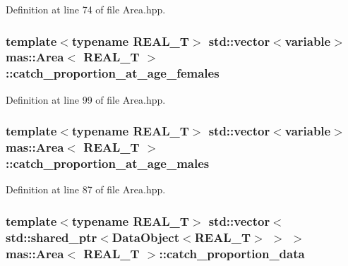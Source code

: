 Definition at line 74 of file Area.\-hpp.

\hypertarget{structmas_1_1_area_a1e2aa0671666187c26108ef2dc669239}{
\subsubsection[{catch\-\_\-proportion\-\_\-at\-\_\-age\-\_\-females}]{\setlength{\rightskip}{0pt plus 5cm}template$<$typename R\-E\-A\-L\-\_\-\-T$>$ std\-::vector$<${\bf variable}$>$ {\bf mas\-::\-Area}$<$ R\-E\-A\-L\-\_\-\-T $>$\-::catch\-\_\-proportion\-\_\-at\-\_\-age\-\_\-females}}\label{structmas_1_1_area_a1e2aa0671666187c26108ef2dc669239}


Definition at line 99 of file Area.\-hpp.

\hypertarget{structmas_1_1_area_a4c7e17b198774676569c7ab30987fee6}{
\subsubsection[{catch\-\_\-proportion\-\_\-at\-\_\-age\-\_\-males}]{\setlength{\rightskip}{0pt plus 5cm}template$<$typename R\-E\-A\-L\-\_\-\-T$>$ std\-::vector$<${\bf variable}$>$ {\bf mas\-::\-Area}$<$ R\-E\-A\-L\-\_\-\-T $>$\-::catch\-\_\-proportion\-\_\-at\-\_\-age\-\_\-males}}\label{structmas_1_1_area_a4c7e17b198774676569c7ab30987fee6}


Definition at line 87 of file Area.\-hpp.

\hypertarget{structmas_1_1_area_a3a14e9f155e3184451799e8fc8db97ab}{
\subsubsection[{catch\-\_\-proportion\-\_\-data}]{\setlength{\rightskip}{0pt plus 5cm}template$<$typename R\-E\-A\-L\-\_\-\-T$>$ std\-::vector$<$std\-::shared\-\_\-ptr$<${\bf Data\-Object}$<$R\-E\-A\-L\-\_\-\-T$>$ $>$ $>$ {\bf mas\-::\-Area}$<$ R\-E\-A\-L\-\_\-\-T $>$\-::catch\-\_\-proportion\-\_\-data}}\label{structmas_1_1_area_a3a14e9f155e3184451799e8fc8db97ab}



